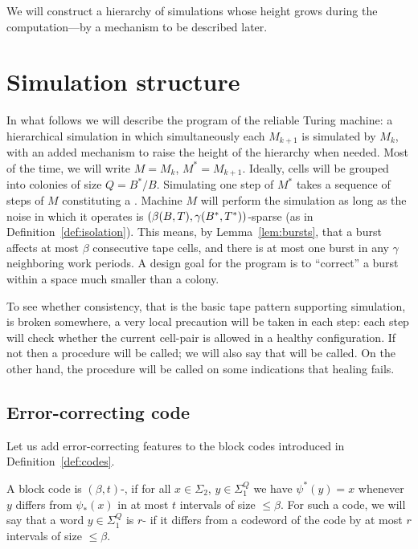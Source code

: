 \documentclass[11pt]{memoir}
\theoremstyle{definition} %
\renewcommand{\le}{\leq}
\def\B{B}
\newcommand{\Q}{Q} %
\newcommand{\Tu}{T}
\newcommand{\Tus}{T^{*}}
\begin{document}
We will construct a hierarchy of simulations whose height grows during the
computation---by a mechanism to be described later.


\section{Simulation structure}\label{sec:sim-struc}

In what follows we will describe the program of the reliable Turing machine:
a hierarchical simulation in which simultaneously each \( M_{k+1} \) is simulated
by \( M_{k} \), with an added mechanism to
raise the height of the hierarchy when needed.
Most of the time, we will write \( M=M_{k} \),  \( M^{*}=M_{k+1} \).
Ideally, cells will be grouped into colonies of size \( \Q=\B^{*}/\B \).
Simulating one step of \( M^{*} \) takes a sequence of steps of \( M \)
constituting a .
Machine \( M \) will perform the simulation as long as the noise
in which it operates is \( (\beta\pair{\B}{\Tu}, \gamma\pair{\B^{*}}{\Tus}) \)-sparse
(as in Definition~\ref{def:isolation}).
This means, by Lemma~\ref{lem:bursts}, that a burst affects at most \( \beta \) consecutive tape cells,  
and there is at most one burst in any \( \gamma \)  neighboring work periods.
A design goal for the program is to
``correct'' a burst within a space much smaller than a colony.

To see whether consistency, that is the basic tape pattern
supporting simulation, is broken somewhere, a very local precaution will be taken in each step:
each step will check whether the current cell-pair is allowed in a healthy configuration.
If not then a  procedure will be called;
we will also say that  will be called.
On the other hand, the  procedure will be called on some indications that
healing fails.


\subsection{Error-correcting code}\label{sec:coding}

Let us add error-correcting features to the block codes introduced in
Definition~\ref{def:codes}.

\begin{sloppypar}
\begin{definition}\label{def:err-code}
A block code is \( (\beta,t) \)-,
if for all \( x\in\Sigma_{2} \), \( y\in\Sigma_{1}^{\Q} \) we
have \( \psi^{*}(y)=x \) whenever \( y \) differs from
\( \psi_{*}(x) \) in at most \( t \) intervals of size \( \le\beta \).
For such a code, we will say that a word \( y\in\Sigma_{1}^{\Q} \) is \( r \)-
if it differs from a codeword of the code by at most \( r \) intervals of size \( \le\beta \).
\end{definition}
  \end{sloppypar}
\end{document}
